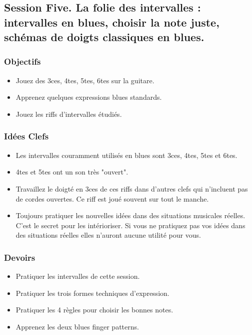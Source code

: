 \documentclass[a4paper]{book}
\begin{document}
\subsection{Session Five. La folie des intervalles : intervalles en blues, choisir la note juste, schémas de doigts classiques en blues.}

\subsubsection{Objectifs}
\begin{itemize}
\item Jouez des 3ces, 4tes, 5tes, 6tes sur la guitare.
\item Apprenez quelques expressions blues standards.
\item Jouez les riffs d'intervalles étudiés.
\end{itemize}

\subsubsection{Idées Clefs}
\begin{itemize}
\item Les intervalles couramment utilisés en blues sont 3ces, 4tes, 5tes et 6tes.
\item 4tes et 5tes ont un son très "ouvert".
\item Travaillez le doigté en 3ces de ces riffs dans d'autres clefs qui n'incluent pas de cordes ouvertes. Ce riff est joué souvent sur tout le manche.
\item Toujours pratiquer les nouvelles idées dans des situations musicales réelles. C'est le secret pour les intérioriser. Si vous ne pratiquez pas vos idées dans des situations réelles elles n'auront aucune utilité pour vous.
\end{itemize}

\subsubsection{Devoirs}
\begin{itemize}
\item Pratiquer les intervalles de cette session.
\item Pratiquer les trois formes techniques d'expression.
\item Pratiquer les 4 règles pour choisir les bonnes notes.
\item Apprenez les deux blues finger patterns.
\end{itemize}
\end{document}
